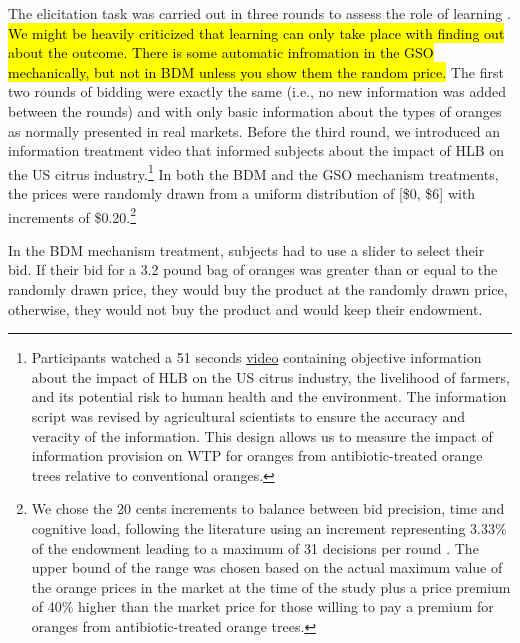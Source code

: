 \documentclass[12pt]{article}
\begin{document}
The elicitation task was carried out in three rounds to assess the role of learning \citep{corrigan2008testing, drichoutis2011role}. \hl{We might be heavily criticized that learning can only take place with finding out about the outcome. There is some automatic infromation in the GSO mechanically, but not in BDM unless you show them the random price.} The first two rounds of bidding were exactly the same (i.e., no new information was added between the rounds) and with only basic information about the types of oranges as normally presented in real markets. Before the third round, we introduced an information treatment video that informed subjects about the impact of HLB on the US citrus industry.\footnote{Participants watched a 51 seconds \href{https://www.youtube.com/watch?v=_AqMBjB0ChM}{video} containing objective information about the impact of HLB on the US citrus industry, the livelihood of farmers, and its potential risk to human health and the environment. The information script was revised by agricultural scientists to ensure the accuracy and veracity of the information. This design allows us to measure the impact of information provision on WTP for oranges from antibiotic-treated orange trees relative to conventional oranges.} In both the BDM and the GSO mechanism treatments, the prices were randomly drawn from a uniform distribution of [\$0, \$6] with increments of \$0.20.\footnote{We chose the 20 cents increments to balance between bid precision, time and cognitive load, following the literature using an increment representing 3.33\% of the endowment leading to a maximum of 31 decisions per round \citep{li_obviously_2017, chakraborty_future_2025}. The upper bound of the range was chosen based on the actual maximum value of the orange prices in the market at the time of the study plus a price premium of 40\% higher than the market price for those willing to pay a premium for oranges from antibiotic-treated orange trees.}

In the BDM mechanism treatment, subjects had to use a slider to select their bid. If their bid for a 3.2 pound bag of oranges was greater than or equal to the randomly drawn price, they would buy the product at the randomly drawn price, otherwise, they would not buy the product and would keep their endowment.
\end{document}
